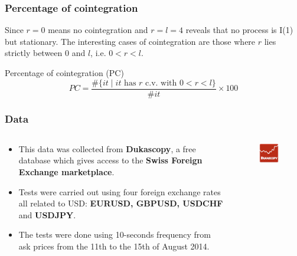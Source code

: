 \documentclass{beamer}
\begin{document}
\begin{frame}
\frametitle{Percentage of cointegration}
Since $r=0$ means no cointegration and $r=l=4$ reveals that no process is I(1) but stationary.
The interesting cases of cointegration are those where $r$ lies strictly
between $0$ and $l$, i.e. $0<r<l$.
\begin{block}{Percentage of cointegration (PC)}
{\color{blue}
\begin{equation*} \label{eq:pcoint}
PC = 
\frac{\#\{ it \mid \text{$it$ has $r$ c.v. with $0<r<l$}\}}
     {\#it}\times 100
\end{equation*}}
\end{block}
\end{frame}

\begin{frame}
\frametitle{Data}
\begin{columns}
\begin{column}{0.7\textwidth}
\begin{itemize}
\item This data was collected from {\bf Dukascopy}, a free
database which gives access to the {\bf Swiss Foreign Exchange marketplace}.
\item Tests were carried out using four foreign exchange rates all related to
USD: {\bf EURUSD, GBPUSD, USDCHF} and {\bf USDJPY}. 
\item The tests were done using 10-seconds frequency from ask prices
from the 11th to the 15th of August 2014. 
\end{itemize}
\end{column}
\begin{column}{0.3\textwidth}
 \begin{figure}[!h]
    \includegraphics[width=\textwidth]{img/dukascopy}

\end{figure}
\end{column}
\end{columns}
\end{frame}
\end{document}
